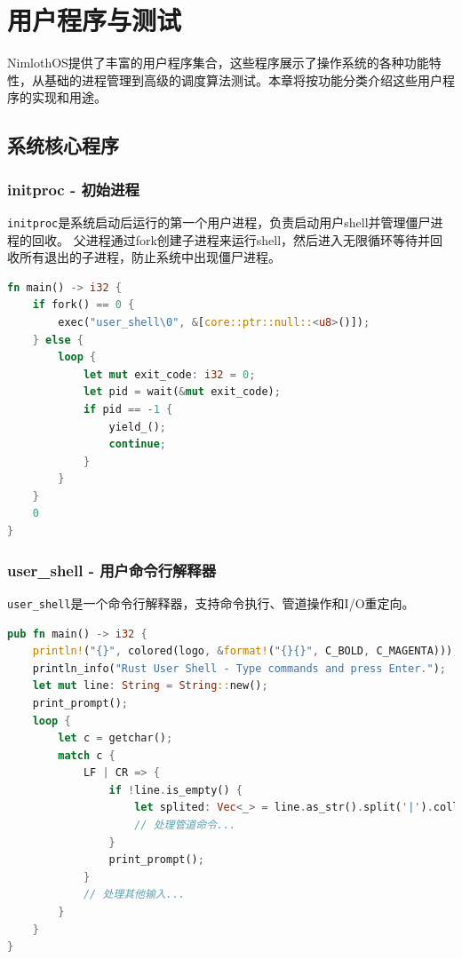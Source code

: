 \chapter{用户程序与测试}

NimlothOS提供了丰富的用户程序集合，这些程序展示了操作系统的各种功能特性，从基础的进程管理到高级的调度算法测试。本章将按功能分类介绍这些用户程序的实现和用途。

\section{系统核心程序}

\subsection{initproc - 初始进程}

\texttt{initproc}是系统启动后运行的第一个用户进程，负责启动用户shell并管理僵尸进程的回收。
父进程通过fork创建子进程来运行shell，然后进入无限循环等待并回收所有退出的子进程，防止系统中出现僵尸进程。

\begin{lstlisting}[language=Rust]
fn main() -> i32 {
    if fork() == 0 {
        exec("user_shell\0", &[core::ptr::null::<u8>()]);
    } else {
        loop {
            let mut exit_code: i32 = 0;
            let pid = wait(&mut exit_code);
            if pid == -1 {
                yield_();
                continue;
            }
        }
    }
    0
}
\end{lstlisting}

\subsection{user\_shell - 用户命令行解释器}

\texttt{user\_shell}是一个命令行解释器，支持命令执行、管道操作和I/O重定向。

\begin{lstlisting}[language=Rust]
pub fn main() -> i32 {
    println!("{}", colored(logo, &format!("{}{}", C_BOLD, C_MAGENTA)));
    println_info("Rust User Shell - Type commands and press Enter.");
    let mut line: String = String::new();
    print_prompt();
    loop {
        let c = getchar();
        match c {
            LF | CR => {
                if !line.is_empty() {
                    let splited: Vec<_> = line.as_str().split('|').collect();
                    // 处理管道命令...
                }
                print_prompt();
            }
            // 处理其他输入...
        }
    }
}
\end{lstlisting}

